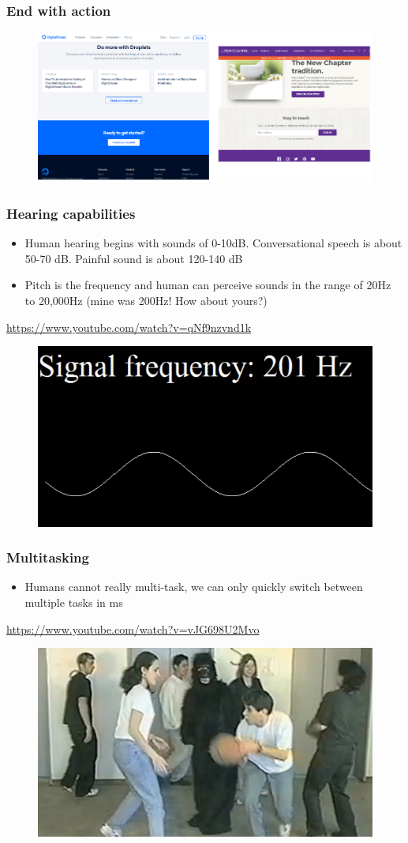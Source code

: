 \documentclass{beamer}
\begin{document}
\begin{frame}
	\frametitle{End with action}
	\begin{figure}
		\includegraphics[width=0.9\linewidth]{image/action}
	\end{figure}
\end{frame}

\begin{frame}
	\frametitle{Hearing capabilities}
	\begin{itemize}
		\item Human hearing begins with sounds of 0-10dB.  Conversational speech is about 50-70 dB.  Painful sound is about 120-140 dB
		\item Pitch is the frequency and human can perceive sounds in the range of 20Hz to 20,000Hz (mine was 200Hz!  How about yours?)
	\end{itemize}
	\centering
	\url{https://www.youtube.com/watch?v=qNf9nzvnd1k}
	\begin{figure}
		\includegraphics[width=0.6\linewidth]{image/soundf}
	\end{figure}
\end{frame}

\begin{frame}
	\frametitle{Multitasking}
	\begin{itemize}
		\item Humans cannot really multi-task, we can only quickly switch between multiple tasks in ms
	\end{itemize}
	\centering
	\url{https://www.youtube.com/watch?v=vJG698U2Mvo}
	\begin{figure}
		\includegraphics[width=0.6\linewidth]{image/gorilla}
	\end{figure}
\end{frame}
\end{document}
